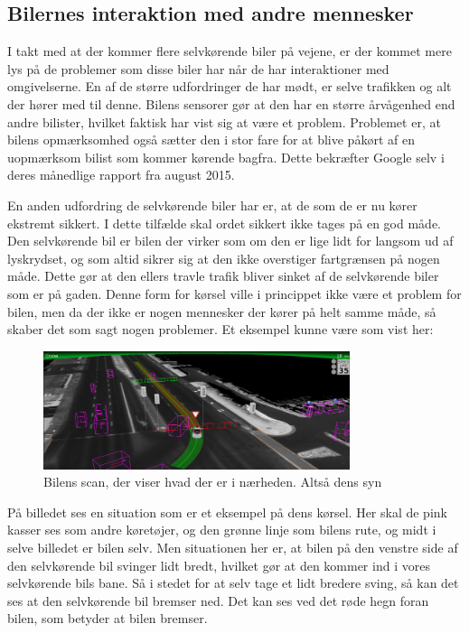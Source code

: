 \subsection{Bilernes interaktion med andre mennesker}
I takt med at der kommer flere  selvkørende biler på vejene, er der kommet mere lys på de problemer som disse biler har når de har interaktioner med omgivelserne. En af de større udfordringer de har mødt, er selve trafikken og alt der hører med til denne. Bilens sensorer gør at den har en større årvågenhed end andre bilister, hvilket faktisk har vist sig at være et problem. Problemet er, at bilens opmærksomhed også sætter den i stor fare for at blive påkørt af en uopmærksom bilist som kommer kørende bagfra. Dette bekræfter Google selv i deres månedlige rapport fra august 2015\cite{GOOG_MONTHLY}. 

En anden udfordring de selvkørende biler har er, at de som de er nu kører ekstremt sikkert. I dette tilfælde skal ordet sikkert ikke tages på en god måde. Den selvkørende bil er bilen der virker som om den er lige lidt for langsom ud af lyskrydset, og som altid sikrer sig at den ikke overstiger fartgrænsen på nogen måde. Dette gør at den ellers travle trafik bliver sinket af de selvkørende biler som er på gaden. Denne form for kørsel ville i princippet ikke være et problem for bilen, men da der ikke er nogen mennesker der kører på helt samme måde, så skaber det som sagt nogen problemer. Et eksempel kunne være som vist her:

\begin{figure}[h!]
    \centering
    \includegraphics[width=0.8\textwidth]{images/google_vision.png}
    \caption{Bilens scan, der viser hvad der er i nærheden. Altså dens syn}
    \label{fig:car_vision}
\end{figure}

På billedet ses en situation som er et eksempel på dens kørsel. Her skal de pink kasser ses som andre køretøjer, og den grønne linje som bilens rute, og midt i selve billedet er bilen selv. Men situationen her er, at bilen på den venstre side af den selvkørende bil svinger lidt bredt, hvilket gør at den kommer ind i vores selvkørende bils bane. Så i stedet for at selv tage et lidt bredere sving, så kan det ses at den selvkørende bil bremser ned. Det kan ses ved det røde hegn foran bilen, som betyder at bilen bremser. 

